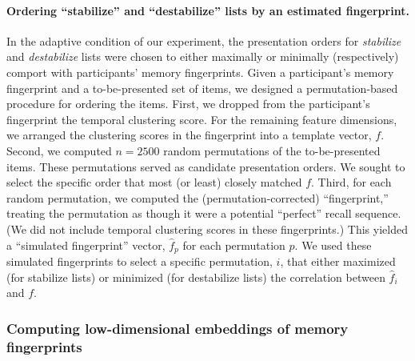 \documentclass[11pt]{article}
\begin{document}
\paragraph{Ordering ``stabilize'' and ``destabilize'' lists by an estimated
fingerprint.}

In the adaptive condition of our experiment, the presentation orders for
\textit{stabilize} and \textit{destabilize} lists were chosen to either
maximally or minimally (respectively) comport with participants' memory
fingerprints. Given a participant's memory fingerprint and a to-be-presented
set of items, we designed a permutation-based procedure for ordering the items.
First, we dropped from the participant's fingerprint the temporal clustering
score. For the remaining feature dimensions, we arranged the clustering scores
in the fingerprint into a template vector, $f$. Second, we computed $n = 2500$
random permutations of the to-be-presented items. These permutations served as
candidate presentation orders. We sought to select the specific order that most
(or least) closely matched $f$. Third, for each random permutation, we computed
the (permutation-corrected) ``fingerprint,'' treating the permutation as though
it were a potential ``perfect'' recall sequence. (We did not include temporal
clustering scores in these fingerprints.) This yielded a ``simulated
fingerprint'' vector, $\hat{f}_p$ for each permutation $p$. We used these
simulated fingerprints to select a specific permutation, $i$, that either
maximized (for stabilize lists) or minimized (for destabilize lists) the
correlation between $\hat{f}_i$ and $f$.

\subsubsection*{Computing low-dimensional embeddings of memory fingerprints}
\end{document}
